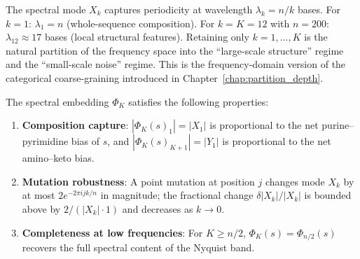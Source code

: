 \begin{remark}
The spectral mode $X_k$ captures periodicity at wavelength $\lambda_k = n/k$
bases. For $k=1$: $\lambda_1 = n$ (whole-sequence composition). For $k=K=12$
with $n=200$: $\lambda_{12} \approx 17$ bases (local structural features).
Retaining only $k=1,\ldots,K$ is the natural partition of the frequency space
into the ``large-scale structure'' regime and the ``small-scale noise'' regime.
This is the frequency-domain version of the categorical coarse-graining
introduced in Chapter~\ref{chap:partition_depth}.
\end{remark}

\begin{theorem}
\label{thm:spectral_embedding}
The spectral embedding $\Phi_K$ satisfies the following properties:
\begin{enumerate}[label=(\roman*)]
  \item \textbf{Composition capture}: $|\Phi_K(s)_1| = |X_1|$ is proportional
        to the net purine--pyrimidine bias of $s$, and $|\Phi_K(s)_{K+1}| = |Y_1|$
        is proportional to the net amino--keto bias.
  \item \textbf{Mutation robustness}: A point mutation at position $j$ changes
        mode $X_k$ by at most $2e^{-2\pi ijk/n}$ in magnitude; the fractional
        change $\delta|X_k|/|X_k|$ is bounded above by $2/(|X_k|\cdot 1)$ and
        decreases as $k \to 0$.
  \item \textbf{Completeness at low frequencies}: For $K \geq n/2$,
        $\Phi_K(s) = \Phi_{n/2}(s)$ recovers the full spectral content of the
        Nyquist band.
\end{enumerate}
\end{theorem}

